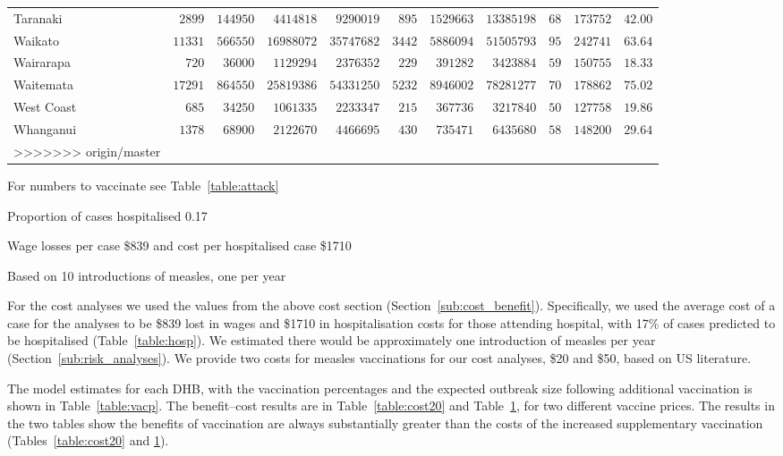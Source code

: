 \documentclass{article}
\begin{document}
\begin{itemize}
\begin{table}
\begin{center}
\begin{tabular}{lrrrrrrrrrr}
Taranaki&$ 2899$&$144950$&$ 4414818$&$ 9290019$&$ 895$&$1529663$&$13385198$&$ 68$&$173752$&$42.00$\tabularnewline
Waikato&$11331$&$566550$&$16988072$&$35747682$&$3442$&$5886094$&$51505793$&$ 95$&$242741$&$63.64$\tabularnewline
Wairarapa&$  720$&$ 36000$&$ 1129294$&$ 2376352$&$ 229$&$ 391282$&$ 3423884$&$ 59$&$150755$&$18.33$\tabularnewline
Waitemata&$17291$&$864550$&$25819386$&$54331250$&$5232$&$8946002$&$78281277$&$ 70$&$178862$&$75.02$\tabularnewline
West Coast&$  685$&$ 34250$&$ 1061335$&$ 2233347$&$ 215$&$ 367736$&$ 3217840$&$ 50$&$127758$&$19.86$\tabularnewline
Whanganui&$ 1378$&$ 68900$&$ 2122670$&$ 4466695$&$ 430$&$ 735471$&$ 6435680$&$ 58$&$148200$&$29.64$\tabularnewline
>>>>>>> origin/master
\hline
\end{tabular}\end{center}\label{table:cost50}
\begin{tablenotes}\footnotesize  
        \item For numbers to vaccinate see Table~\ref{table:attack}
        \item Proportion of cases hospitalised 0.17
        \item Wage losses per case \$839 and cost per hospitalised case \$1710
        \item Based on 10 introductions of measles, one per year
      \end{tablenotes}  
\end{table}


For the cost analyses we used the values from the above cost section (Section~\ref{sub:cost_benefit}). Specifically, we used the average cost of a case for the analyses to be \$839 lost in wages and \$1710 in hospitalisation costs for those attending hospital, with 17\% of cases predicted to be hospitalised (Table~\ref{table:hosp}). We estimated there would be approximately one introduction of measles per year (Section~\ref{sub:risk_analyses}). We provide two costs for measles vaccinations for our cost analyses, \$20 and \$50, based on US literature.

The model estimates for each DHB, with the vaccination percentages and the expected outbreak size following additional vaccination is shown in Table~\ref{table:vacp}. The benefit--cost results are in Table~\ref{table:cost20} and Table~\ref{table:cost50}, for two different vaccine prices. The results in the two tables show the benefits of vaccination are always substantially greater than the costs of the increased supplementary vaccination (Tables~\ref{table:cost20} and \ref{table:cost50}).


\end{itemize}
\end{document}
